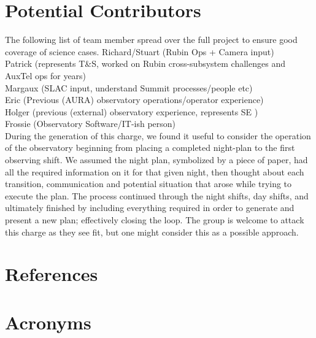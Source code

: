 \documentclass[SE,authoryear,toc]{lsstdoc}
\begin{document}
\section{Potential Contributors}
The following list of team member spread over the full project to ensure good coverage of science cases. 
Richard/Stuart (Rubin Ops + Camera input)\\
Patrick (represents T\&S, worked on Rubin cross-subsystem challenges and AuxTel ops for years)\\
Margaux (SLAC input, understand Summit processes/people etc)\\
Eric (Previous (AURA) observatory operations/operator experience)\\
Holger (previous (external) observatory experience, represents SE )\\
Frossie (Observatory Software/IT-ish person)\\

During the generation of this charge, we found it useful to consider the operation of the observatory beginning from placing a completed night-plan to the first observing shift. 
We assumed the night plan, symbolized by a piece of paper, had all the required information on it for that given night, then thought about each transition, communication and potential situation that arose while trying to execute the plan. 
The process continued through the night shifts, day shifts, and ultimately finished by including everything required in order to generate and present a new plan; effectively closing the loop. 
The group is welcome to attack this charge as they see fit, but one might consider this as a possible approach.



\appendix
\section{References} \label{sec:bib}
\renewcommand{\refname}{} %


\section{Acronyms} \label{sec:acronyms}

\end{document}
